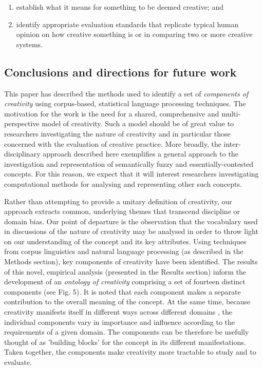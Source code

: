\documentclass[10pt,letterpaper]{article}
\begin{document}
\begin{enumerate}
\item establish what it means for something to be deemed creative; and
\item identify appropriate evaluation standards that replicate typical human opinion on how creative something is or in comparing two or more creative systems.
\end{enumerate}




\subsection*{Conclusions and directions for future work}
\label{conclusions}


This paper has described the methods used to identify a set of {\em components of creativity} using corpus-based, statistical language processing techniques. The motivation for the work is the need for a shared, comprehensive and multi-perspective model of creativity. Such a model should be of great value to researchers investigating the nature of creativity and in particular those concerned with the evaluation of creative practice. More broadly, the inter-disciplinary approach described here exemplifies a general approach to the investigation and representation of semantically fuzzy and essentially-contested concepts. For this reason, we expect that it will interest researchers investigating computational methods for analysing and representing other such concepts.


Rather than attempting to provide a unitary definition of creativity, our approach extracts common, underlying themes that transcend discipline or domain bias. Our point of departure is the observation that the vocabulary used in discussions of the nature of creativity may be analysed in order to throw light on our understanding of the concept and its key attributes. Using techniques from corpus linguistics and natural language processing (as described in the Methods section), key components of creativity have been identified. The results of this novel, empirical analysis (presented in the Results section) inform the development of an {\em ontology of creativity\/} comprising a set of fourteen distinct components (see Fig. 5). %
It is noted that each component makes a separate contribution to the overall meaning of the concept. At the same time, because creativity manifests itself in different ways across different domains \cite{plucker04}, the individual components vary in importance and influence according to the requirements of a given domain. The components can be therefore be usefully thought of as 'building blocks' for the concept in its different manifestations. Taken together, the components make creativity more tractable to study and to evaluate. 
\end{document}
